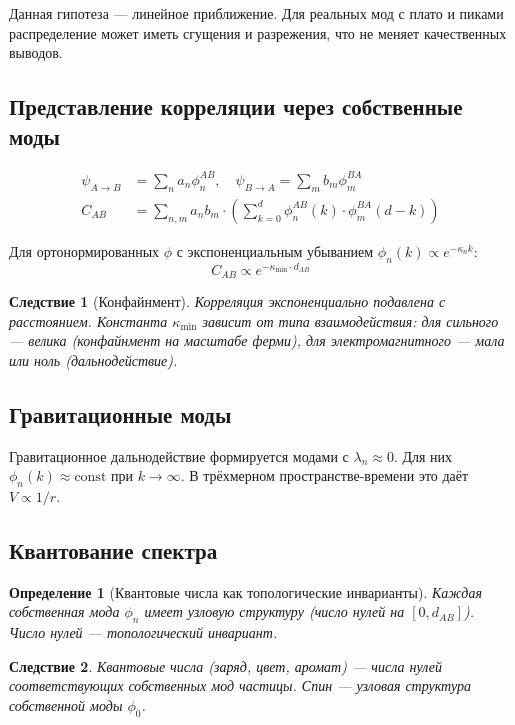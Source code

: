 \documentclass[11pt,a4paper]{article}
\newtheorem{definition}{Определение}[section]
\newtheorem{corollary}{Следствие}[section]
\theoremstyle{definition}
\begin{document}
Данная гипотеза --- линейное приближение. Для реальных мод с плато и пиками распределение может иметь сгущения и разрежения, что не меняет качественных выводов.

\subsection{Представление корреляции через собственные моды}

\begin{align}
    \psi_{A \to B} &= \sum_n a_n \phi_n^{AB}, \quad \psi_{B \to A} = \sum_m b_m \phi_m^{BA} \\
    C_{AB} &= \sum_{n,m} a_n b_m \cdot \left( \sum_{k=0}^{d} \phi_n^{AB}(k) \cdot \phi_m^{BA}(d-k) \right)
\end{align}

Для ортонормированных $\phi$ с экспоненциальным убыванием $\phi_n(k) \propto e^{-\kappa_n k}$:
\begin{equation}
    C_{AB} \propto e^{-\kappa_{\min} \cdot d_{AB}}
\end{equation}

\begin{corollary}[Конфайнмент]
Корреляция экспоненциально подавлена с расстоянием. Константа $\kappa_{\min}$ зависит от типа взаимодействия: для сильного --- велика (конфайнмент на масштабе ферми), для электромагнитного --- мала или ноль (дальнодействие).
\end{corollary}

\subsection{Гравитационные моды}

Гравитационное дальнодействие формируется модами с $\lambda_n \approx 0$. Для них $\phi_n(k) \approx \text{const}$ при $k \to \infty$. В трёхмерном пространстве-времени это даёт $V \propto 1/r$.

\subsection{Квантование спектра}

\begin{definition}[Квантовые числа как топологические инварианты]
Каждая собственная мода $\phi_n$ имеет узловую структуру (число нулей на $[0, d_{AB}]$). Число нулей --- топологический инвариант.
\end{definition}

\begin{corollary}
Квантовые числа (заряд, цвет, аромат) --- числа нулей соответствующих собственных мод частицы. Спин --- узловая структура собственной моды $\phi_0$.
\end{corollary}
\end{document}
